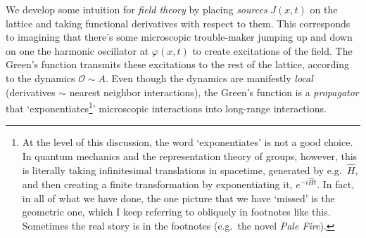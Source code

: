 We develop some intuition for \emph{field theory} by placing \emph{sources} $J(x,t)$ on the lattice and taking functional derivatives with respect to them. This corresponds to imagining that there's some microscopic trouble-maker jumping up and down on one the harmonic oscillator at $\varphi(x,t)$ to create excitations of the field. The Green's function transmits these excitations to the rest of the lattice, according to the dynamics $\mathcal O \sim A$. Even though the dynamics are manifestly \emph{local} (derivatives $\sim$ nearest neighbor interactions), the Green's function is a \emph{propagator} that `exponentiates\footnote{At the level of this discussion, the word `exponentiates' is not a good choice. In quantum mechanics and the representation theory of groups, however, this is literally taking infinitesimal translations in spacetime, generated by e.g.~$\hat H$, and then creating a finite transformation by exponentiating it, $e^{-i\hat H t}$. In fact, in all of what we have done, the one picture that we have `missed' is the geometric one, which I keep referring to obliquely in footnotes like this. Sometimes the real story is in the footnotes (e.g.~the novel \emph{Pale Fire}).}' microscopic interactions into long-range interactions.

